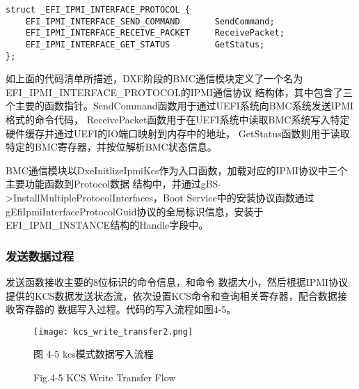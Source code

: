 \begin{lstlisting}
struct _EFI_IPMI_INTERFACE_PROTOCOL {
    EFI_IPMI_INTERFACE_SEND_COMMAND       SendCommand;
    EFI_IPMI_INTERFACE_RECEIVE_PACKET     ReceivePacket;
    EFI_IPMI_INTERFACE_GET_STATUS         GetStatus;
};
\end{lstlisting}
如上面的代码清单所描述，DXE阶段的BMC通信模块定义了一个名为EFI\_IPMI\_INTERFACE\_PROTOCOL的IPMI通信协议
结构体，其中包含了三个主要的函数指针。SendCommand函数用于通过UEFI系统向BMC系统发送IPMI格式的命令代码，
ReceivePacket函数用于在UEFI系统中读取BMC系统写入特定硬件缓存并通过UEFI的IO端口映射到内存中的地址，
GetStatus函数则用于读取特定的BMC寄存器，并按位解析BMC状态信息\cite{addition7}。
\par BMC通信模块以DxeInitlizeIpmiKcs作为入口函数，加载对应的IPMI协议\newline 中三个主要功能函数到Protocol数据
结构中，并通过gBS->InstallMultipleProtocolI\newline nterfaces，Boot Service中的安装协议函数通过
gEfiIpmiInterfaceProtocolGuid协议的全局标识信息，安装于EFI\_IPMI\_INSTANCE结构的Handle字段中。

\subsubsection{发送数据过程}
发送函数接收主要的8位标识的命令信息，和命令
数据大小，然后根据IPMI协议提供的KCS数据发送状态流，依次设置KCS命令和查询相关寄存器，配合数据接收寄存器的
数据写入过程\cite{english22}。代码的写入流程如图4-5。

\begin{figure}[htb]
    \vspace{0cm}   
    \setlength{\abovecaptionskip}{0.3cm}
	\centering
    \texttt{[image: kcs\_write\_transfer2.png]}
    \caption*{图 4-5 kcs模式数据写入流程}
    \setlength{\belowcaptionskip}{-0.7cm}
    \caption*{Fig.4-5 KCS Write Transfer Flow}
\end{figure}

